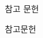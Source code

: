 \documentclass[10pt,xcolor=pdftex,dvipsnames,table,handout]{beamer}
\begin{document}
		\begin{frame}[plain]
		\end{frame}

		\begin{frame}[plain]
		\Huge{참고 문헌}
		\end{frame}



		\begin{frame}[t]{참고문헌}

		\end{frame}



























\end{document}
